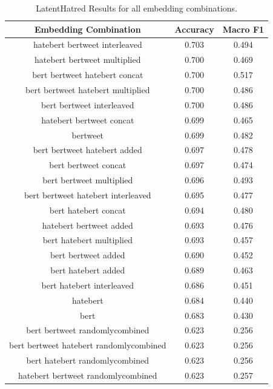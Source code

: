 \documentclass{article} %
\begin{document}
\begin{table}[htbp]
\begin{center}
    \begin{tabular}{|c|c|c|}
    \hline
    Embedding Combination & Accuracy & Macro F1\\
    \hline \hline
    hatebert bertweet interleaved            &     0.703 &     0.494 \\ \hline
    hatebert bertweet multiplied             &     0.700 &     0.469 \\ \hline
    bert bertweet hatebert concat            &     0.700 &     0.517 \\ \hline
    bert bertweet hatebert multiplied        &     0.700 &     0.486 \\ \hline
    bert bertweet interleaved                &     0.700 &     0.486 \\ \hline
    hatebert bertweet concat                 &     0.699 &     0.465 \\ \hline
    bertweet                                 &     0.699 &     0.482 \\ \hline
    bert bertweet hatebert added             &     0.697 &     0.478 \\ \hline
    bert bertweet concat                     &     0.697 &     0.474 \\ \hline
    bert bertweet multiplied                 &     0.696 &     0.493 \\ \hline
    bert bertweet hatebert interleaved       &     0.695 &     0.477 \\ \hline
    bert hatebert concat                     &     0.694 &     0.480 \\ \hline
    hatebert bertweet added                  &     0.693 &     0.476 \\ \hline
    bert hatebert multiplied                 &     0.693 &     0.457 \\ \hline
    bert bertweet added                      &     0.690 &     0.452 \\ \hline
    bert hatebert added                      &     0.689 &     0.463 \\ \hline
    bert hatebert interleaved                &     0.686 &     0.451 \\
    hatebert                                 &     0.684 &     0.440 \\ \hline
    bert                                     &     0.683 &     0.430 \\ \hline
    bert bertweet randomlycombined           &     0.623 &     0.256 \\ \hline
    bert bertweet hatebert randomlycombined  &     0.623 &     0.256 \\ \hline
    bert hatebert randomlycombined           &     0.623 &     0.256 \\ \hline
    hatebert bertweet randomlycombined       &     0.623 &     0.257 \\ \hline
    \end{tabular}
    \caption{LatentHatred Results for all embedding combinations.}
    \label{resultsTable:latenthatred-full-results}
\end{center}
\end{table}
\end{document}
